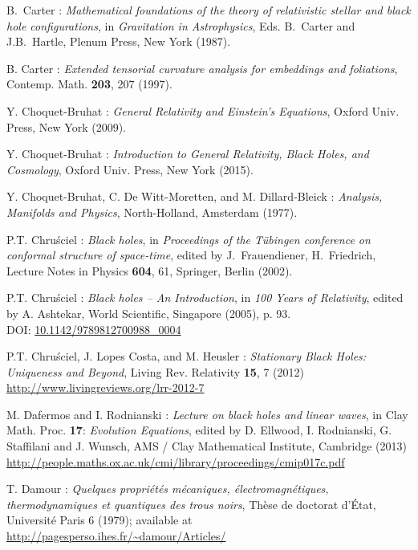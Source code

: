 \begin{thebibliography}{123}
B.~Carter : {\em Mathematical foundations of the theory of
relativistic stellar and black hole configurations},
in {\em Gravitation in Astrophysics}, Eds. B.~Carter and J.B.~Hartle,
Plenum Press, New York (1987).

B. Carter : {\em Extended tensorial curvature analysis for embeddings
and foliations},
Contemp. Math. {\bf 203}, 207 (1997).

Y. Choquet-Bruhat : {\em General Relativity and Einstein's Equations},
Oxford Univ. Press, New York (2009).

Y. Choquet-Bruhat : {\em Introduction to General Relativity, Black Holes, and
Cosmology}, Oxford Univ. Press, New York (2015).

Y. Choquet-Bruhat, C. De Witt-Moretten, and M. Dillard-Bleick :
{\em Analysis, Manifolds and Physics},
North-Holland, Amsterdam (1977).

P.T. Chru\'sciel : {\em Black holes},
in {\em Proceedings of the T\"ubingen conference on conformal structure of
space-time}, edited by J.~Frauendiener, H.~Friedrich,
Lecture Notes in Physics {\bf 604}, 61,
Springer, Berlin (2002).

P.T. Chru\'sciel : {\em Black holes -- An Introduction},
in {\em 100 Years of Relativity}, edited by A. Ashtekar,
World Scientific, Singapore (2005), p. 93.\\
DOI: \href{http://dx.doi.org/doi:10.1142/9789812700988_0004}{10.1142/9789812700988\_0004}

P.T. Chru\'sciel, J. Lopes Costa, and M. Heusler :
{\em Stationary Black Holes: Uniqueness and Beyond},
Living Rev. Relativity {\bf 15}, 7 (2012) \\
\url{http://www.livingreviews.org/lrr-2012-7}

M. Dafermos and I. Rodnianski : {\em Lecture on black holes and linear waves},
in  Clay Math. Proc. {\bf 17}: {\em Evolution Equations}, edited by
D. Ellwood, I. Rodnianski, G. Staffilani and J. Wunsch, AMS / Clay Mathematical Institute,
Cambridge (2013) \\
\url{http://people.maths.ox.ac.uk/cmi/library/proceedings/cmip017c.pdf}

T. Damour : {\em Quelques propri\'et\'es m\'ecaniques, \'electromagn\'etiques,
thermo\-dy\-na\-mi\-ques et quantiques des trous noirs},
Th\`ese de doctorat d'\'Etat, Universit\'e Paris 6 (1979); available at\\
\url{http://pagesperso.ihes.fr/~damour/Articles/}


\end{thebibliography}
